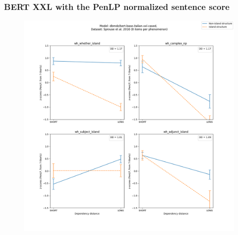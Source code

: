 \subsubsection{BERT XXL with the PenLP normalized sentence score}
\begin{figure}[h]
	\centering
	\includegraphics[width=1\textwidth]{images/AppendixA/Sprouse_wh_dbmdz_bert-base-italian-xxl-cased_PenLP-zscores-likert-2022-09-14_h17m26s15.png} 
	\label{A-fig:sprouse_bert_penlp}
	\caption{}
\end{figure}

\clearpage
